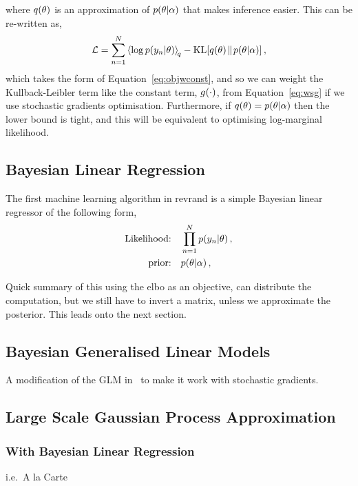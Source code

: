 \documentclass[11pt, oneside]{article}
\begin{document}
where $q\!\left({\theta}\right)$ is an approximation of $p\!\left({\theta}\middle\vert{\ensuremath{\alpha}}\right)$ that 
makes inference easier. This can be re-written as,
\begin{equation}
    \elbo = \sum^N_{n=1} \expec{q}{\log\probC{\targs_n}{\param}} -
    \KL{\qrob{\param}}{\probC{\param}{\hyper}},
    \label{eq:elbo}
\end{equation}
which takes the form of Equation~\eqref{eq:objwconst}, and so we can weight the
Kullback-Leibler term like the constant term, ${g}_{}\!\left({{\cdot}}\right)$, from
Equation~\eqref{eq:wsg} if we use stochastic gradients optimisation.
Furthermore, if $q\!\left({\theta}\right) = p\!\left({\theta}\middle\vert{\ensuremath{\alpha}}\right)$ then the lower bound
is tight, and this will be equivalent to optimising log-marginal likelihood.


\subsection{Bayesian Linear Regression}

The first machine learning algorithm in revrand is a simple Bayesian linear
regressor of the following form,
\begin{align}
    \text{Likelihood:} \quad &\prod^N_{n=1} p\!\left({y_n}\middle\vert{\ensuremath{\theta}}\right), \\
    \text{prior:} \quad &p\!\left({\theta}\middle\vert{\ensuremath{\alpha}}\right),
\end{align}


Quick summary of this using the elbo as an objective, can distribute the
computation, but we still have to invert a matrix, unless we approximate the
posterior. This leads onto the next section.

\subsection{Bayesian Generalised Linear Models}

A modification of the GLM in~\cite{gershman2012} to make it work with
stochastic gradients.

\subsection{Large Scale Gaussian Process Approximation}

\subsubsection{With Bayesian Linear Regression}

i.e.\ A la Carte~\cite{yang2014}
\end{document}
